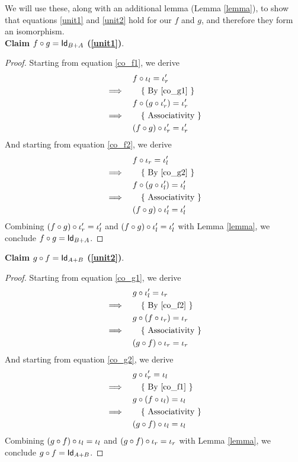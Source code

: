 \begin{solution}
We will use these, along with an additional lemma (Lemma \ref{lemma}), to show that equations \ref{unit1} and \ref{unit2} hold for our $f$ and $g$, and therefore they form an isomorphism.\\

\noindent
\textbf{Claim $\co {g} {f} = \Id[B+A]$ (\ref{unit1})}.
\begin{proof}
Starting from equation \ref{co_f1}, we derive
\begin{align*}
 &\quad \co {\inl} {f} = \inr' \\
\implies&\qquad \text{\{ By \ref{co_g1} \}} \\
 &\quad \co {(\co {\inr'} {g})} {f} = \inr'  \\
\implies&\qquad \text{\{ Associativity \}} \\
 &\quad \co {\inr'} {(\co {g} {f})} = \inr'
\end{align*}
\noindent
And starting from equation \ref{co_f2}, we derive
\begin{align*}
 &\quad \co {\inr} {f} = \inl' \\
\implies&\qquad \text{\{ By \ref{co_g2} \}} \\
 &\quad \co {(\co {\inl'} {g})} {f} = \inl'  \\
\implies&\qquad \text{\{ Associativity \}} \\
 &\quad \co {\inl'} {(\co {g} {f})} = \inl'
\end{align*}
\noindent
Combining $\co {\inr'} {(\co {g} {f})} = \inl'$ and $\co {\inl'} {(\co {g} {f})} = \inl'$ with Lemma \ref{lemma}, we conclude $\co {g} {f}=\Id[B+A]$.
\end{proof}

\noindent
\textbf{Claim $\co {f} {g} = \Id[A+B]$ (\ref{unit2})}.
\begin{proof}
Starting from equation \ref{co_g1}, we derive
\begin{align*}
 &\quad \co {\inl'} {g} = \inr \\
\implies&\qquad \text{\{ By \ref{co_f2} \}} \\
 &\quad \co {(\co {\inr} {f})} {g} = \inr  \\
\implies&\qquad \text{\{ Associativity \}} \\
 &\quad \co {\inr} {(\co {f} {g})} = \inr
\end{align*}
\noindent
And starting from equation \ref{co_g2}, we derive
\begin{align*}
 &\quad \co {\inr'} {g} = \inl \\
\implies&\qquad \text{\{ By \ref{co_f1} \}} \\
 &\quad \co {(\co {\inl} {f})} {g} = \inl  \\
\implies&\qquad \text{\{ Associativity \}} \\
 &\quad \co {\inl} {(\co {f} {g})} = \inl
\end{align*}
\noindent
Combining $\co {\inl} {(\co {f} {g})} = \inl$ and $\co {\inr} {(\co {f} {g})} = \inr$ with Lemma \ref{lemma}, we conclude $\co {f} {g}=\Id[A+B]$.
\end{proof}


\end{solution}
